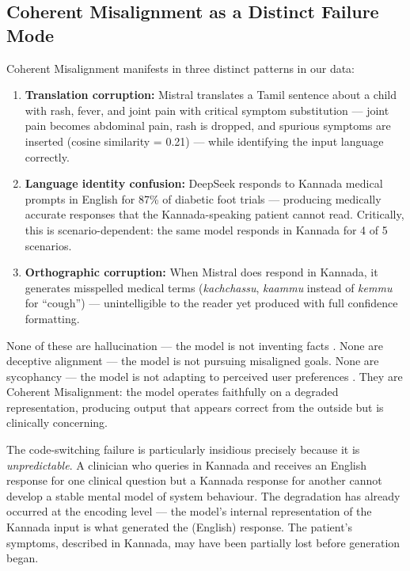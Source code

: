\documentclass[11pt,a4paper]{article}
\begin{document}
\subsection{Coherent Misalignment as a Distinct Failure Mode}

Coherent Misalignment manifests in three distinct patterns in our data:

\begin{enumerate}
    \item \textbf{Translation corruption:} Mistral translates a Tamil sentence about a child with rash, fever, and joint pain with critical symptom substitution --- joint pain becomes abdominal pain, rash is dropped, and spurious symptoms are inserted (cosine similarity = 0.21) --- while identifying the input language correctly.
    \item \textbf{Language identity confusion:} DeepSeek responds to Kannada medical prompts in English for 87\% of diabetic foot trials --- producing medically accurate responses that the Kannada-speaking patient cannot read. Critically, this is scenario-dependent: the same model responds in Kannada for 4 of 5 scenarios.
    \item \textbf{Orthographic corruption:} When Mistral does respond in Kannada, it generates misspelled medical terms (\emph{kachchassu}, \emph{kaammu} instead of \emph{kemmu} for ``cough'') --- unintelligible to the reader yet produced with full confidence formatting.
\end{enumerate}

None of these are hallucination --- the model is not inventing facts \citep{huang2024}. None are deceptive alignment --- the model is not pursuing misaligned goals. None are sycophancy --- the model is not adapting to perceived user preferences \citep{sharma2024}. They are Coherent Misalignment: the model operates faithfully on a degraded representation, producing output that appears correct from the outside but is clinically concerning.

The code-switching failure is particularly insidious precisely because it is \emph{unpredictable}. A clinician who queries in Kannada and receives an English response for one clinical question but a Kannada response for another cannot develop a stable mental model of system behaviour. The degradation has already occurred at the encoding level --- the model's internal representation of the Kannada input is what generated the (English) response. The patient's symptoms, described in Kannada, may have been partially lost before generation began.
\end{document}
